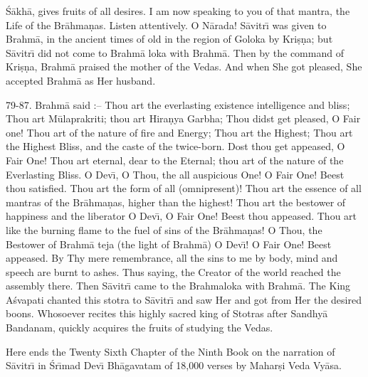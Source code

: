 \'S\=akh\=a, gives fruits of all desires. I am now speaking to you of that mantra, the Life of the Br\=ahma\d{n}as. Listen attentively. O N\=arada! S\=avitr\={\i} was given to Brahm\=a, in the ancient times of old in the region of Goloka by Kri\d{s}\d{n}a; but S\=avitr\={\i} did not come to Brahm\=a loka with Brahm\=a. Then by the command of Kri\d{s}\d{n}a, Brahm\=a praised the mother of the Vedas. And when She got pleased, She accepted Brahm\=a as Her husband.

79-87. Brahm\=a said :-- Thou art the everlasting existence intelligence and bliss; Thou art M\=ulaprakriti; thou art Hira\d{n}ya Garbha; Thou didst get pleased, O Fair one! Thou art of the nature of fire and Energy; Thou art the Highest; Thou art the Highest Bliss, and the caste of the twice-born. Dost thou get appeased, O Fair One! Thou art eternal, dear to the Eternal; thou art of the nature of the Everlasting Bliss. O Dev\={\i}, O Thou, the all auspicious One! O Fair One! Beest thou satisfied. Thou art the form of all (omnipresent)! Thou art the essence of all mantras of the Br\=ahma\d{n}as, higher than the highest! Thou art the bestower of happiness and the liberator O Dev\={\i}, O Fair One! Beest thou appeased. Thou art like the burning flame to the fuel of sins of the Br\=ahma\d{n}as! O Thou, the Bestower of Brahm\=a teja (the light of Brahm\=a) O Dev\={\i}! O Fair One! Beest appeased. By Thy mere remembrance, all the sins to me by body, mind and speech are burnt to ashes. Thus saying, the Creator of the world reached the assembly there. Then S\=avitr\={\i} came to the Brahmaloka with Brahm\=a. The King A\'svapati chanted this stotra to S\=avitr\={\i} and saw Her and got from Her the desired boons. Whosoever recites this highly sacred king of Stotras after Sandhy\=a Bandanam, quickly acquires the fruits of studying the Vedas.

Here ends the Twenty Sixth Chapter of the Ninth Book on the narration of S\=avitr\={\i} in \'Sr\={\i}mad Dev\={\i} Bh\=agavatam of 18,000 verses by Mahar\d{s}i Veda Vy\=asa.



